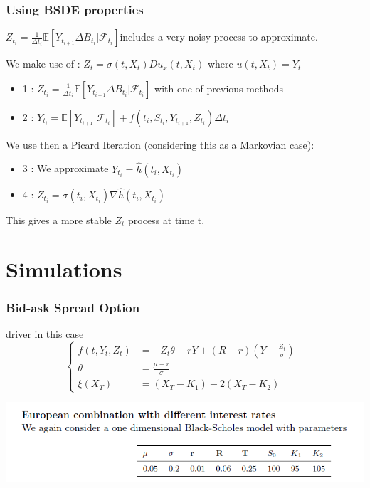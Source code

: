 \documentclass[10pt]{beamer}
\begin{document}
	 \begin{frame}
	 	\frametitle{Using BSDE properties}
	 	
	 	$Z_{t_i} = \frac{1}{\Delta t_i}\mathbb{E}[Y_{t_{i + 1}} \Delta B_{t_i}  | \mathcal{F}_{t_i}]$includes a very noisy process to approximate. 
	 	\pause
	 	
	 	\vspace{1cm} 
	 	We make use of :  $Z_t = \sigma(t, X_t) Du_x (t, X_t)$  where $u(t, X_t) = Y_t$
	 	
	 	\pause
	 
	 	
	 	\begin{itemize}
	 		\item 1 : $Z_{t_i} = \frac{1}{\Delta t_i}\mathbb{E}[Y_{t_{i + 1}} \Delta B_{t_i}  | \mathcal{F}_{t_i}]$ with one of previous methods 
	 		\item 2 : $Y_{t_i} = \mathbb{E}[Y_{t_{i + 1}} | \mathcal{F}_{t_i}] +  f(t_i,S_{t_i}, Y_{t_{i + 1}}, Z_{t_i})\Delta t_i$
	 			\end{itemize}
	 	We use then a Picard Iteration (considering this as a Markovian case): 
	 	\begin{itemize}
	 		\item 3 : We approximate $Y_{t_i} = \hat{h}(t_i, X_{t_i})$
	 		\item 4  : $Z_{t_i} = \sigma(t_i, X_{t_i}) \nabla\hat{h}(t_i, X_{t_i})$
	 	\end{itemize}
	 	
	 	This gives a more stable $Z_t$ process at time t. 
	 	
	 \end{frame}
	 
\section{Simulations}

\begin{frame}
	\frametitle{Bid-ask Spread Option}
	
	\begin{block}{driver in this case}
		\[
		\left\{
		\begin{aligned}
		f(t,Y_t,Z_t) & =  -Z_t\theta  - rY + (R-r)(Y-\frac{Z_t}{\sigma})^-\\
		\theta &= \frac{\mu - r}{\sigma}\\
		\xi(X_T) & = (X_T - K_1) - 2(X_T - K_2)
		\end{aligned}
		\right.
		\]	
	
	\end{block}
	\centering
	\includegraphics[scale = 0.5]{bid_ask.png} 
	
\end{frame}
\end{document}
